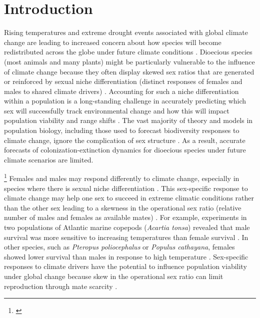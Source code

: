 \documentclass[12pt]{article}
\newcommand{\tom}[2]{{\color{red}{#1}}\footnote{\textit{\color{red}{#2}}}}
\begin{document}
\newpage
\section*{Introduction}
Rising temperatures and extreme drought events associated with global climate change are leading to increased concern about how species will become redistributed across the globe under future climate conditions \citep{bertrand2011changes,gamelon2017interactions,smith2024extreme}.
Dioecious species (most animals and many plants) might be particularly vulnerable to the influence of climate change because they often display skewed sex ratios that are generated or reinforced by sexual niche differentiation (distinct responses of females and males to shared climate drivers) \citep{Tognetti2012}. 
Accounting for such a niche differentiation within a population is a long-standing challenge in accurately predicting which sex will successfully track environmental change and how this will impact population viability and range shifts \citep{jones1999sex,gissi2023exploring}. 
The vast majority of theory and models in population biology, including those used to forecast biodiversity responses to climate change, ignore the complication of sex structure \citep{pottier2021sexual,ellis2017does}.
As a result, accurate forecasts of colonization-extinction dynamics for dioecious species under future climate scenarios are limited.

\tom{Climate change can influence dioecious populations via shifts in sex ratio.}{This paragraph is really good but notice that the topic sentence (and much that follows) is largely redundant with the first paragraph. I would suggest creating clearer distinction between paragraphs.} 
Females and males may respond differently to climate change, especially in species where there is sexual niche differentiation \citep{gissi2023exploring,gissi2023sex,hultine2016climate}. 
This sex-specific response to climate change may help one sex to succeed in extreme climatic conditions rather than the other sex \citep{zhao2012sex, burli2022environmental} leading to a skewness in the operational sex ratio (relative number of males and females as available mates) \citep{eberhart2017sex}.
For example, experiments in two populations of Atlantic marine copepods (\textit{Acartia tonsa}) revealed that male survival was more sensitive to increasing temperatures than female survival \citep{sasaki2019complex}.
In other species, such as \textit{Pteropus poliocephalus} or \textit {Populus cathayana}, females showed lower survival than males in response to high temperature \citep{welbergen2008climate,zhao2012sex}. 
Sex-specific responses to climate drivers have the potential to influence population viability under global change because skew in the operational sex ratio can limit reproduction through mate scarcity \citep{petry2016sex}.
\end{document}
